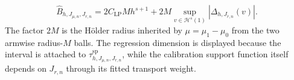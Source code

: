 \[
\widehat B_{h,J_{\mu,n},J_{r,n}}=2C_{\mathrm{LP}}Mh^{s+1}+2M\sup_{v\in\mathcal H^s(1)}|\Delta_{h,J_{r,n}}(v)|.
\]
The factor \(2M\) is the Hölder radius inherited by \(\mu=\mu_1-\mu_0\) from the two armwise radius-\(M\) balls. The regression dimension is displayed because the interval is attached to \(\widehat\tau^{\mathrm{sp}}_{h,J_{\mu,n},J_{r,n}}\), while the calibration support function itself depends on \(J_{r,n}\) through its fitted transport weight.